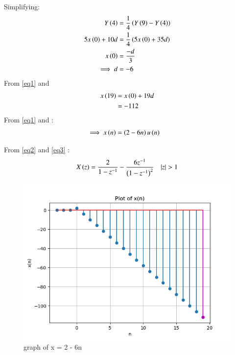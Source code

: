 \documentclass[journal,12pt,twocolumn]{IEEEtran}
\theoremstyle{remark}
\begin{document}
Simplifying:
    \begin{align}
        Y\left(4\right) &= \frac{1}{4}\left(Y\left(9\right)-Y\left(4\right)\right)\\
        5x\left(0\right) + 10d &= \frac{1}{4}\left(5x\left(0\right) + 35d\right)\\
        x\left(0\right) &= \frac{-d}{3}\\
        \implies d &= -6 \label{eq1}
    \end{align}
    From \eqref{eq1} and 
    \begin{align}
        x\left(19\right)&=x\left(0\right)+19d\\ 
        &= -112
    \end{align}
From \eqref{eq1} and :
    \begin{align}
        \implies x\left(n\right)&=\left(2-6n\right)u\left(n\right) \label{eq3}
    \end{align}
    
From \eqref{eq2} and \eqref{eq3} :
    \begin{align}
        X\brak{z}=\frac{2}{1-z^{-1}} - \frac{6z^{-1}}{\brak{1-z^{-1}}^{2}} \quad |z|>1
    \end{align}

    \begin{figure}[h]
    \renewcommand\thefigure{1}
        \centering
        \includegraphics[width=1\linewidth]{figs/Figure_1.png}
        \caption{graph of x = 2 - 6n}
    \end{figure}
\end{document}
